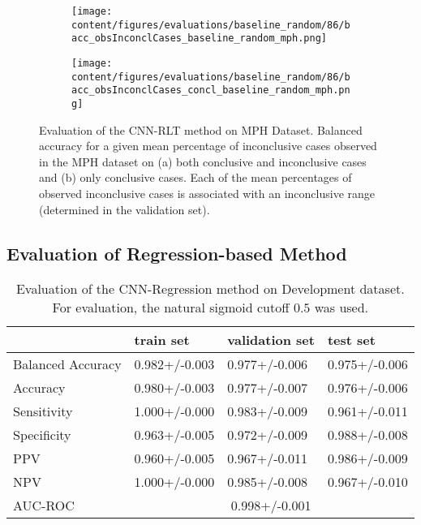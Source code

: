 \begin{figure}[t]
\begin{subfigure}{0.9\textwidth}
  \centering
  \texttt{[image: content/figures/evaluations/baseline\_random/86/bacc\_obsInconclCases\_baseline\_random\_mph.png]}
  \subcaption{}
  \label{fig:bacc_obsInconclCases_baseline_random_mph}
\end{subfigure}
\hfill
\begin{subfigure}{0.9\textwidth}
  \centering
  \texttt{[image: content/figures/evaluations/baseline\_random/86/bacc\_obsInconclCases\_concl\_baseline\_random\_mph.png]}
  \subcaption{}
  \label{fig:bacc_obsInconclCases_concl_baseline_random_mph}
\end{subfigure}

\caption{Evaluation of the CNN-RLT method on MPH Dataset.
Balanced accuracy for a given mean percentage of inconclusive cases observed in the MPH dataset on 
(a) both conclusive and inconclusive cases and (b) only conclusive cases. 
Each of the mean percentages of observed inconclusive cases is associated 
with an inconclusive range (determined in the validation set). }
\label{fig:bacc_obsInconclCases_baseline_random_mph_full}
\end{figure}


\subsection{Evaluation of Regression-based Method}
\label{subsec:eval_regression}





\begin{table}[ht]
  \caption{Evaluation of the CNN-Regression method on Development dataset. 
  For evaluation, the natural sigmoid cutoff $0.5$ was used.}
  \centering
  \begin{tabular}{llll}
      \hline
                        & train set         & validation set      & test set             \\
      \hline
      Balanced Accuracy & 0.982+/-0.003   &  0.977+/-0.006    &  0.975+/-0.006 \\
      Accuracy          & 0.980+/-0.003     &   0.977+/-0.007   &  0.976+/-0.006  \\
      Sensitivity       &  1.000+/-0.000   &   0.983+/-0.009   &  0.961+/-0.011 \\
      Specificity       &   0.963+/-0.005  &   0.972+/-0.009 &   0.988+/-0.008 \\
      PPV               &  0.960+/-0.005    &   0.967+/-0.011  &  0.986+/-0.009  \\
      NPV               &  1.000+/-0.000  &   0.985+/-0.008   & 0.967+/-0.010 \\
      \hline
      AUC-ROC          &  \multicolumn{3}{c}{0.998+/-0.001}  \\
      \hline
  \end{tabular}
 \label{t1:cnn_regression_perf_eval_table}
\end{table}


